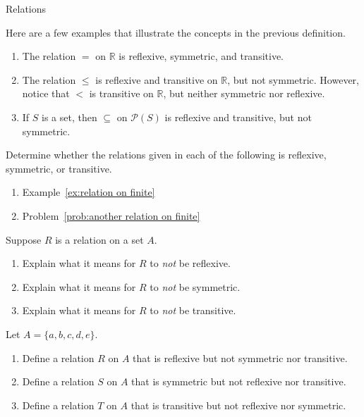 \begin{section}{Relations}
\begin{example}
Here are a few examples that illustrate the concepts in the previous definition.
\begin{enumerate}[label=\textrm{(\alph*)}]
\item The relation $=$ on $\mathbb{R}$ is reflexive, symmetric, and transitive.
\item The relation $\leq$ is reflexive and transitive on $\mathbb{R}$, but not symmetric. However, notice that $<$ is transitive on $\mathbb{R}$, but neither symmetric nor reflexive.
\item If $S$ is a set, then $\subseteq$ on $\mathcal{P}(S)$ is reflexive and transitive, but not symmetric.
\end{enumerate}
\end{example}

\begin{problem}
Determine whether the relations given in each of the following is reflexive, symmetric, or transitive.
\begin{enumerate}[label=\textrm{(\alph*)}]
\item Example~\ref{ex:relation on finite}
\item Problem~\ref{prob:another relation on finite}
\end{enumerate}
\end{problem}

\begin{problem}
Suppose $R$ is a relation on a set $A$.
\begin{enumerate}[label=\textrm{(\alph*)}]
\item Explain what it means for $R$ to \emph{not} be reflexive.
\item Explain what it means for $R$ to \emph{not} be symmetric.
\item Explain what it means for $R$ to \emph{not} be transitive.
\end{enumerate}
\end{problem}

\begin{problem}
Let $A=\{a,b,c,d,e\}$.
\begin{enumerate}[label=\textrm{(\alph*)}]
\item Define a relation $R$ on $A$ that is reflexive but not symmetric nor transitive.
\item Define a relation $S$ on $A$ that is symmetric but not reflexive nor transitive.
\item Define a relation $T$ on $A$ that is transitive but not reflexive nor symmetric.
\end{enumerate}
\end{problem}


\end{section}
